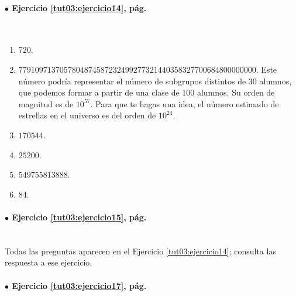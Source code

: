 \documentclass[10pt,a4paper]{article}\usepackage[]{graphicx}\usepackage[]{color}
\begin{document}
\paragraph{\bf $\bullet$ Ejercicio \ref{tut03:ejercicio14}, pág. \pageref{tut03:ejercicio14}}
\label{tut03:ejercicio14:sol}\quad\\

\begin{enumerate}
\item $720$.
\item $7791097137057804874587232499277321440358327700684800000000$.
Este número podría representar el número de subgrupos distintos de 30 alumnos, que podemos formar a partir de una clase de 100 alumnos. Su orden de magnitud es de $10^{57}$. Para que te hagas una idea, el número estimado de estrellas en el universo es del orden de $10^{24}$.
\item $170544$.
\item $25200$.
\item $549755813888$.
\item $84$.
\end{enumerate}

\paragraph{\bf $\bullet$ Ejercicio \ref{tut03:ejercicio15}, pág. \pageref{tut03:ejercicio15}}
\label{tut03:ejercicio15:sol}\quad\\

Todas las preguntas aparecen en el Ejercicio \ref{tut03:ejercicio14}; consulta las respuesta a ese ejercicio.


\paragraph{\bf $\bullet$ Ejercicio \ref{tut03:ejercicio17}, pág. \pageref{tut03:ejercicio17}}
\label{tut03:ejercicio17:sol}\quad\\
\end{document}
